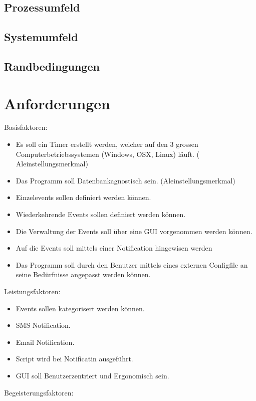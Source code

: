 \documentclass[11pt,titelpage]{scrreprt}
\begin{document}
\subsection{Prozessumfeld}
\subsection{Systemumfeld}
\subsection{Randbedingungen}
\section{Anforderungen}
Basisfaktoren:
\begin{itemize}
 \item Es soll ein Timer erstellt werden, welcher auf den 3 grossen Computerbetriebssystemen (Windows, OSX, Linux)  läuft. ( Aleinstellungsmerkmal)
 \item Das Programm soll Datenbankagnostisch sein. (Aleinstellungsmerkmal)
 \item Einzelevents sollen definiert werden können.
 \item Wiederkehrende Events sollen definiert werden können.
 \item Die Verwaltung der Events soll über eine GUI vorgenommen werden können.
 \item Auf die Events soll mittels einer Notification hingewisen werden
 \item Das Programm soll durch den Benutzer mittels  eines externen Configfile an seine Bedürfnisse angepasst werden können.
\end{itemize}

Leistungsfaktoren:
\begin{itemize}
 \item Events sollen kategorisert werden können.
 \item SMS Notification.
 \item Email Notification.
 \item Script wird bei Notificatin ausgeführt.
 \item GUI soll Benutzerzentriert und Ergonomisch sein.
\end{itemize}

Begeisterungsfaktoren:
\end{document}
